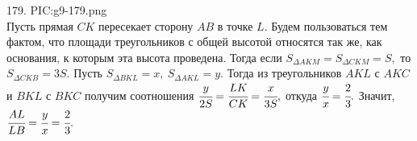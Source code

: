 179. {{PIC:g9-179.png}}\\
Пусть прямая $CK$ пересекает сторону $AB$ в точке $L.$ Будем пользоваться тем фактом, что площади треугольников с общей высотой относятся так же, как основания, к которым эта высота проведена. Тогда если $S_{\Delta AKM}=S_{\Delta CKM}=S,$ то $S_{\Delta CKB}=3S.$ Пусть $S_{\Delta BKL}=x,\ S_{\Delta AKL}=y.$ Тогда из треугольников $AKL$ с $AKC$ и $BKL$ с $BKC$ получим соотношения $\cfrac{y}{2S}=\cfrac{LK}{CK}=\cfrac{x}{3S},$ откуда $\cfrac{y}{x}=\cfrac{2}{3}.$ Значит, $\cfrac{AL}{LB}=\cfrac{y}{x}=\cfrac{2}{3}.$\\
